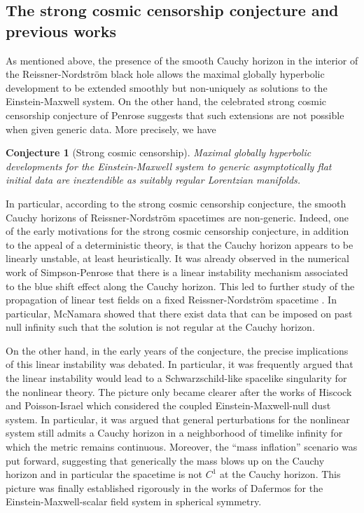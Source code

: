\documentclass[12 pt, reqno]{amsart}
\newtheorem{conjecture}[theorem]{Conjecture}
\theoremstyle{definition}
\theoremstyle{remark}
\numberwithin{equation}{section}
\newcommand{\0}{\emptyset}
\begin{document}
\subsection{The strong cosmic censorship conjecture and previous works}\label{SCC}

As mentioned above, the presence of the smooth Cauchy horizon in the interior of the Reissner-Nordstr\"om black hole allows the maximal globally hyperbolic development to be extended smoothly but non-uniquely as solutions to the Einstein-Maxwell system. On the other hand, the celebrated strong cosmic censorship conjecture of Penrose suggests that such extensions are not possible when given generic data. More precisely, we have

\begin{conjecture}[Strong cosmic censorship]
Maximal globally hyperbolic developments for the Einstein-Maxwell system to generic asymptotically flat initial data are inextendible as suitably regular Lorentzian manifolds.
\end{conjecture}

In particular, according to the strong cosmic censorship conjecture, the smooth Cauchy horizons of Reissner-Nordstr\"om spacetimes are non-generic. Indeed, one of the early motivations for the strong cosmic censorship conjecture, in addition to the appeal of a deterministic theory, is that the Cauchy horizon appears to be linearly unstable, at least heuristically. It was already observed in the numerical work of Simpson-Penrose \cite{SP} that there is a linear instability mechanism associated to the blue shift effect along the Cauchy horizon. This led to further study of the propagation of linear test fields on a fixed Reissner-Nordstr\"om spacetime \cite{McN, CH, GSNS}. In particular, McNamara \cite{McN} showed that there exist data that can be imposed on past null infinity such that the solution is not regular at the Cauchy horizon.

On the other hand, in the early years of the conjecture, the precise implications of this linear instability was debated. In particular, it was frequently argued that the linear instability would lead to a Schwarzschild-like spacelike singularity for the nonlinear theory. The picture only became clearer after the works of Hiscock \cite{Hiscock} and Poisson-Israel \cite{PI1, PI2} which considered the coupled Einstein-Maxwell-null dust system. In particular, it was argued that general perturbations for the nonlinear system still admits a Cauchy horizon in a neighborhood of timelike infinity for which the metric remains continuous. Moreover, the ``mass inflation'' scenario was put forward, suggesting that generically the mass blows up on the Cauchy horizon and in particular the spacetime is not $C^1$ at the Cauchy horizon. This picture was finally established rigorously in the works of Dafermos \cite{D1, D2} for the Einstein-Maxwell-scalar field system in spherical symmetry.
\end{document}
